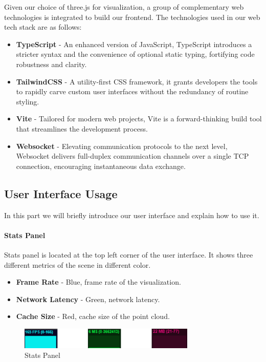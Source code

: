 \documentclass[11pt, a4paper,oneside,chapterprefix=false]{scrbook}
\begin{document}
Given our choice of three.js for visualization, a group of complementary web technologies is integrated to build our frontend. The technologies used in our web tech stack are as follows:

\begin{itemize}
	\item \textbf{TypeScript} - An enhanced version of JavaScript, TypeScript introduces a stricter syntax and the convenience of optional static typing, fortifying code robustness and clarity.
	
	\item \textbf{TailwindCSS} - A utility-first CSS framework, it grants developers the tools to rapidly carve custom user interfaces without the redundancy of routine styling.
	
	\item \textbf{Vite} - Tailored for modern web projects, Vite is a forward-thinking build tool that streamlines the development process.
	
	\item \textbf{Websocket} - Elevating communication protocols to the next level, Websocket delivers full-duplex communication channels over a single TCP connection, encouraging instantaneous data exchange.
\end{itemize}

\subsection{User Interface Usage}

In this part we will briefly introduce our user interface and explain how to use it.

\paragraph{Stats Panel}

Stats panel is located at the top left corner of the user interface. It shows three different metrics of the scene in different color.

\begin{itemize}
	\item \textbf{Frame Rate} - Blue, frame rate of the visualization.
	\item \textbf{Network Latency} - Green, network latency.
	\item \textbf{Cache Size} - Red, cache size of the point cloud.
\end{itemize}


\begin{figure}[H]
    \centering
    \includegraphics*[width=0.75\textwidth]{figures/stats panel.png}
    \caption{Stats Panel}
    \label{fig:stats panel}
\end{figure}
\end{document}
